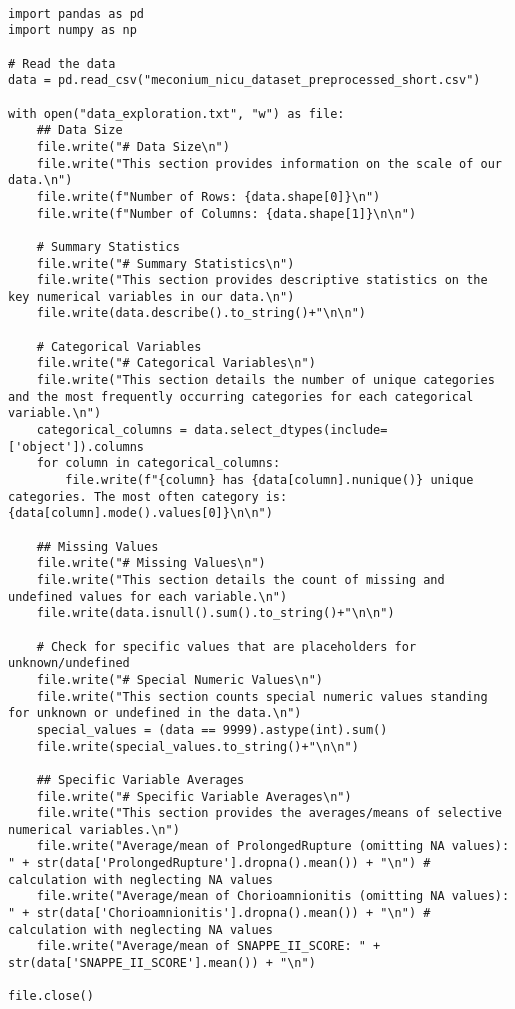 \documentclass[11pt]{article}
\begin{document}
\begin{verbatim}

import pandas as pd
import numpy as np

# Read the data
data = pd.read_csv("meconium_nicu_dataset_preprocessed_short.csv")

with open("data_exploration.txt", "w") as file:
    ## Data Size
    file.write("# Data Size\n")
    file.write("This section provides information on the scale of our data.\n")
    file.write(f"Number of Rows: {data.shape[0]}\n")
    file.write(f"Number of Columns: {data.shape[1]}\n\n")

    # Summary Statistics
    file.write("# Summary Statistics\n")
    file.write("This section provides descriptive statistics on the key numerical variables in our data.\n")
    file.write(data.describe().to_string()+"\n\n")

    # Categorical Variables
    file.write("# Categorical Variables\n")
    file.write("This section details the number of unique categories and the most frequently occurring categories for each categorical variable.\n")
    categorical_columns = data.select_dtypes(include=['object']).columns
    for column in categorical_columns:
        file.write(f"{column} has {data[column].nunique()} unique categories. The most often category is: {data[column].mode().values[0]}\n\n")

    ## Missing Values
    file.write("# Missing Values\n")
    file.write("This section details the count of missing and undefined values for each variable.\n")
    file.write(data.isnull().sum().to_string()+"\n\n")

    # Check for specific values that are placeholders for unknown/undefined
    file.write("# Special Numeric Values\n")
    file.write("This section counts special numeric values standing for unknown or undefined in the data.\n")
    special_values = (data == 9999).astype(int).sum()
    file.write(special_values.to_string()+"\n\n")

    ## Specific Variable Averages
    file.write("# Specific Variable Averages\n")
    file.write("This section provides the averages/means of selective numerical variables.\n") 
    file.write("Average/mean of ProlongedRupture (omitting NA values): " + str(data['ProlongedRupture'].dropna().mean()) + "\n") # calculation with neglecting NA values
    file.write("Average/mean of Chorioamnionitis (omitting NA values): " + str(data['Chorioamnionitis'].dropna().mean()) + "\n") # calculation with neglecting NA values
    file.write("Average/mean of SNAPPE_II_SCORE: " + str(data['SNAPPE_II_SCORE'].mean()) + "\n")

file.close()

\end{verbatim}
\end{document}

